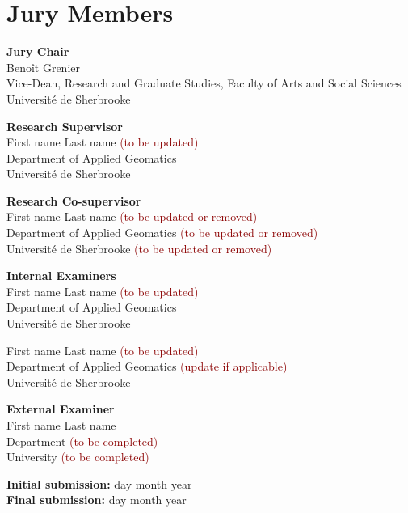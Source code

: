 \chapter*{Jury Members}
\thispagestyle{empty}

\textbf{Jury Chair} \\
Benoît Grenier \\
Vice-Dean, Research and Graduate Studies, Faculty of Arts and Social Sciences \\
Université de Sherbrooke
\vspace{0.5cm}

\textbf{Research Supervisor} \\
First name Last name \textcolor{darkred}{(to be updated)} \\
Department of Applied Geomatics \\
Université de Sherbrooke
\vspace{0.5cm}

\textbf{Research Co-supervisor} \\
First name Last name \textcolor{darkred}{(to be updated or removed)} \\
Department of Applied Geomatics \textcolor{darkred}{(to be updated or removed)} \\
Université de Sherbrooke \textcolor{darkred}{(to be updated or removed)}
\vspace{0.5cm}

\textbf{Internal Examiners} \\
First name Last name \textcolor{darkred}{(to be updated)} \\
Department of Applied Geomatics \\
Université de Sherbrooke
\vspace{0.5cm}

First name Last name \textcolor{darkred}{(to be updated)} \\
Department of Applied Geomatics \textcolor{darkred}{(update if applicable)}\\
Université de Sherbrooke
\vspace{0.5cm}

\textbf{External Examiner} \\
First name Last name \\
Department \textcolor{darkred}{(to be completed)} \\
University \textcolor{darkred}{(to be completed)}
\vspace{.5cm}

\vfill

\begin{center}
\textbf{Initial submission:} day month year \\
\textbf{Final submission:} day month year
\end{center}

\newpage
